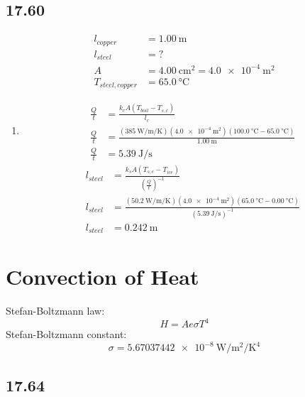 \documentclass{article}
\begin{document}
\subsection{17.60}

\begin{align*}
	l_{copper} & = \SI{1.00}{\meter} \\
	l_{steel} & = ? \\
	A & = \SI{4.00}{\centi \meter \squared} = \SI{4.0e-4}{\meter \squared} \\
	T_{steel,copper} & = \SI{65.0}{\celsius}
\end{align*}
\begin{enumerate}[label = \boldalph]
	\item
		\begin{align*}
			\frac{ Q }{ t } & = \frac{ k_{c}A(T_{boil} - T_{s,c}) }{ l_{c} } \\
			\frac{ Q }{ t } & = \frac{ (\SI{385}{\watt \per \meter \per \kelvin})(\SI{4.0e-4}{\meter \squared})(\SI{100.0}{\celsius} - \SI{65.0}{\celsius}) }{ \SI{1.00}{\meter} } \\
			\frac{ Q }{ t } & = \SI{5.39}{\joule \per \second}
		\end{align*}
		\begin{align*}
			l_{steel} & = \frac{ k_{s}A(T_{s,c} - T_{ice}) }{ \left( \frac{ Q }{ t } \right)^{-1} } \\
			l_{steel} & = \frac{ (\SI{50.2}{\watt \per \meter \per \kelvin})(\SI{4.0e-4}{\meter \squared})(\SI{65.0}{\celsius} - \SI{0.00}{\celsius}) }{ \left( \SI{5.39}{\joule \per \second} \right)^{-1} } \\
			l_{steel} & = \SI{0.242}{\meter}
		\end{align*}
\end{enumerate}

\section{Convection of Heat}

Stefan-Boltzmann law:
\begin{equation}
	H = Ae\sigma T^4
\end{equation}
Stefan-Boltzmann constant:
\begin{equation}
	\sigma = \SI{5.67037442e-8}{\watt \per \meter \squared \per \kelvin \tothe{4}}
\end{equation}

\subsection{17.64}
\end{document}
